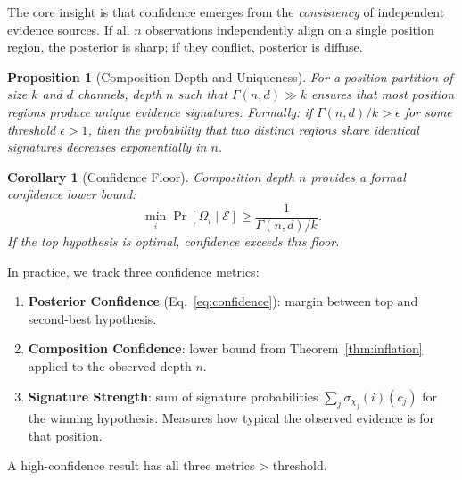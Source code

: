 \documentclass[twocolumn,10pt]{article}
\newtheorem{corollary}[theorem]{Corollary}
\newtheorem{proposition}[theorem]{Proposition}
\begin{document}
The core insight is that confidence emerges from the \emph{consistency}
of independent evidence sources. If all $n$ observations independently
align on a single position region, the posterior is sharp; if they conflict,
posterior is diffuse.

\begin{proposition}[Composition Depth and Uniqueness]
\label{prop:depth-unique}
For a position partition of size $k$ and $d$ channels, depth $n$ such that
$\Gamma(n,d) \gg k$ ensures that most position regions produce unique
evidence signatures. Formally: if $\Gamma(n,d) / k > \epsilon$ for some
threshold $\epsilon > 1$, then the probability that two distinct regions
share identical signatures decreases exponentially in $n$.
\end{proposition}

\begin{corollary}[Confidence Floor]
\label{cor:conf-floor}
Composition depth $n$ provides a formal confidence lower bound:
\begin{equation}
  \min_i \Pr[\Omega_i \mid \mathcal{E}] \geq \frac{1}{\Gamma(n,d) / k}.
\end{equation}
If the top hypothesis is optimal, confidence exceeds this floor.
\end{corollary}

In practice, we track three confidence metrics:

\begin{enumerate}[leftmargin=1.5em,topsep=2pt,itemsep=1pt]
  \item \textbf{Posterior Confidence} (Eq.~\ref{eq:confidence}): margin
    between top and second-best hypothesis.

  \item \textbf{Composition Confidence}: lower bound from Theorem~\ref{thm:inflation}
    applied to the observed depth $n$.

  \item \textbf{Signature Strength}: sum of signature probabilities
    $\sum_j \sigma_{\chi_j}(i)(c_j)$ for the winning hypothesis. Measures
    how typical the observed evidence is for that position.
\end{enumerate}

A high-confidence result has all three metrics > threshold.
\end{document}
